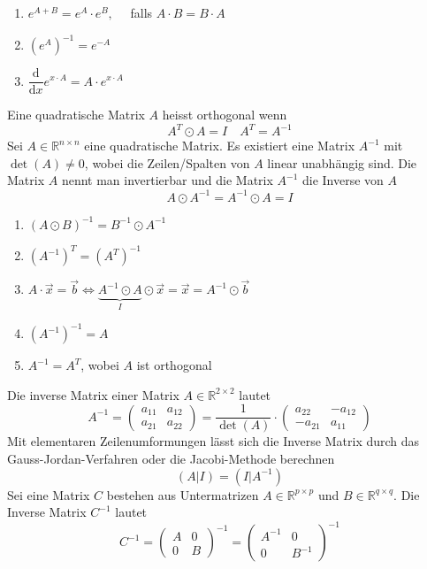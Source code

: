 \begin{enumerate}[$(i)$]
\item $e^{A+B}=e^A\cdot e^B,\quad $ falls $A\cdot B=B\cdot A$
\item $\left(e^A\right)^{-1}=e^{-A}$
\item $\dfrac{\text{d}}{\text{d}x}e^{x\cdot A}=A\cdot e^{x\cdot A}$
\end{enumerate}
Eine quadratische Matrix $A$ heisst orthogonal wenn
\begin{equation}
\boxed{A^T\odot A=I}\quad \boxed{A^T=A^{-1}}
\end{equation}
Sei $A\in\mathbb{R}^{n\times n}$ eine quadratische Matrix. Es existiert eine Matrix $A^{-1}$ mit $\det\left(A\right)\neq 0$, wobei die Zeilen/Spalten von $A$ linear unabhängig sind. Die Matrix $A$ nennt man invertierbar und die Matrix $A^{-1}$ die Inverse von $A$
\begin{equation}
\boxed{A\odot A^{-1}=A^{-1}\odot A=I}
\end{equation}
\begin{enumerate}[$(i)$]
\item $\left(A\odot B\right)^{-1}=B^{-1}\odot A^{-1}$
\item $\left(A^{-1}\right)^T=\left(A^T\right)^{-1}$
\item $A\cdot \overrightarrow{x}=\overrightarrow{b}\Leftrightarrow \underbrace{ A^{-1}\odot A}_{I}\odot \overrightarrow{x}=\overrightarrow{x}=A^{-1}\odot\overrightarrow{b}$
\item $\left(A^{-1}\right)^{-1}=A$
\item $A^{-1}=A^T$, wobei $A$ ist orthogonal
\end{enumerate}
Die inverse Matrix einer Matrix $A\in\mathbb{R}^{2\times 2}$ lautet
\begin{equation}
\boxed{A^{-1}=\begin{pmatrix}a_{11}&a_{12}\\a_{21}&a_{22}\end{pmatrix}=\dfrac{1}{\det\left(A\right)}\cdot \begin{pmatrix}a_{22}&-a_{12}\\-a_{21}&a_{11}\end{pmatrix}}
\end{equation}
Mit elementaren Zeilenumformungen lässt sich die Inverse Matrix durch das Gauss-Jordan-Verfahren oder die Jacobi-Methode berechnen
\begin{equation}
\boxed{\left(A\Big\vert I\right)=\left(I\Big\vert A^{-1}\right)}
\end{equation}
Sei eine Matrix $C$ bestehen aus Untermatrizen $A\in\mathbb{R}^{p\times p}$ und $B\in\mathbb{R}^{q\times q}$. Die Inverse Matrix $C^{-1}$ lautet
\begin{equation} 
\boxed{C^{-1}=\begin{pmatrix}A&0\\0&B\end{pmatrix}^{-1}=\begin{pmatrix}A^{-1}&0\\0&B^{-1}\end{pmatrix}^{-1}}
\end{equation} 
